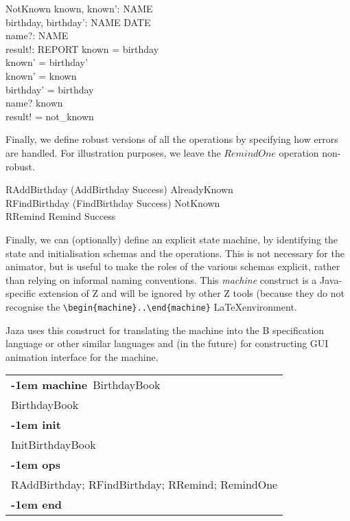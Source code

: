 \documentclass{article}
\makeatletter
\newenvironment{machine}[1]{
    \begin{tabular}{@{\qquad}l}\textbf{\kern-1em machine}\ #1\\ }{
    \\ \textbf{\kern-1em end} \end{tabular} }
\newcommand{\machineInit}{\\ \textbf{\kern-1em init} \\}
\newcommand{\machineOps}{\\ \textbf{\kern-1em ops} \\}
\makeatother
\begin{document}
\begin{schema}{NotKnown}
    known, known': \power NAME \\
    birthday, birthday': NAME \pfun DATE \\
    name?: NAME \\
    result!: REPORT
\where
    known = \dom birthday \\
    known' = \dom birthday' \\
    known' = known \\
    birthday' = birthday \\
    name? \notin known \\
    result! = not\_known
\end{schema}

Finally, we define robust versions of all the operations
by specifying how errors are handled.  
For illustration purposes, we leave the $RemindOne$ operation non-robust.

\begin{zed} 
    RAddBirthday  (AddBirthday \land Success) \lor AlreadyKnown \\
    RFindBirthday  (FindBirthday \land Success) \lor NotKnown \\
    RRemind  Remind \land Success
\end{zed}

Finally, we can (optionally) define an explicit state machine,
by identifying the state and initialisation schemas and the
operations.  This is not necessary for the animator, but is
useful to make the roles of the various schemas explicit, rather
than relying on informal naming conventions.  
This \emph{machine} construct is a Java-specific extension of Z
and will be ignored by other Z tools (because they do not
recognise the \verb!\begin{machine}..\end{machine}! \LaTeX environment.

Jaza uses this construct for translating the machine into the B
specification language or other similar languages and (in the future) for
constructing GUI animation interface for the machine.


\begin{machine}{BirthdayBook}
  BirthdayBook
\machineInit
  InitBirthdayBook
\machineOps
    RAddBirthday; 
    RFindBirthday;
    RRemind;
    RemindOne
\end{machine}
\end{document}
